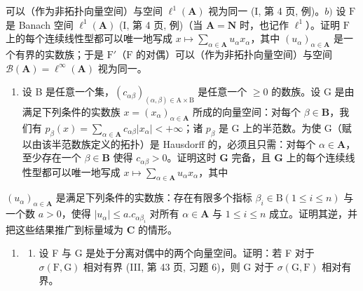 可以（作为非拓扑向量空间）与空间 \(\ell^1 (\mathbf{A})\) 视为同一 (I, 第 4 页, 例)。\(b)\) 设 \(\mathrm{F}\) 是 Banach 空间 \(\ell^1 (\mathbf{A})\) (I, 第 4 页, 例)（当 \(\mathbf{A} = \mathbf{N}\) 时，也记作 \(\ell^1\)）。证明 \(\mathrm{F}\) 上的每个连续线性型都可以唯一地写成 \(x\mapsto \sum_{\alpha \in \mathbf{A}}u_{\alpha}x_{\alpha}\)，其中 \((u_{\alpha})_{\alpha \in \mathbf{A}}\) 是一个有界的实数族；于是 \(\mathrm{F}'\)（\(\mathrm{F}\) 的对偶）可以（作为非拓扑向量空间）与空间 \(\mathcal{B}(\mathbf{A}) = \ell^{\infty}(\mathbf{A})\) 视为同一。

\begin{enumerate}
\def\labelenumi{\alph{enumi})}
\setcounter{enumi}{2}
\tightlist
\item
  设 B 是任意一个集，\((c_{\alpha \beta})_{(\alpha ,\beta)\in \mathrm{A}\times \mathrm{B}}\) 是任意一个 \(\geqslant 0\) 的数族。设 G 是由满足下列条件的实数族 \(x = (x_{\alpha})_{\alpha \in \mathbf{A}}\) 所成的向量空间：对每个 \(\beta \in \mathbf{B}\)，我们有 \(p_{\beta}(x) = \sum_{\alpha \in \mathbf{A}}c_{\alpha \beta}|x_{\alpha}| < + \infty\)；诸 \(p_{\beta}\) 是 G 上的半范数。为使 G（赋以由该半范数族定义的拓扑）是 Hausdorff 的，必须且只需：对每个 \(\alpha \in \mathbf{A}\)，至少存在一个 \(\beta \in \mathbf{B}\) 使得 \(c_{\alpha \beta} > 0\)。证明这时 \(\mathbf{G}\) 完备，且 \(\mathbf{G}\) 上的每个连续线性型都可以唯一地写成 \(x \mapsto \sum_{\alpha \in \mathbf{A}} u_{\alpha} x_{\alpha}\)，其中
\end{enumerate}

\((u_{\alpha})_{\alpha \in \mathbf{A}}\) 是满足下列条件的实数族：存在有限多个指标 \(\beta_{i}\in \mathrm{B}(1\leqslant i\leqslant n)\) 与一个数 \(a > 0\)，使得 \(|u_{\alpha}|\leqslant a.c_{\alpha \beta_i}\) 对所有 \(\alpha \in \mathbf{A}\) 与 \(1\leqslant i\leqslant n\) 成立。证明其逆，并把这些结果推广到标量域为 \(\mathbf{C}\) 的情形。

\begin{enumerate}
\def\labelenumi{\arabic{enumi})}
\setcounter{enumi}{1}
\tightlist
\item
  \begin{enumerate}
  \def\labelenumii{\alph{enumii})}
  \tightlist
  \item
    设 F 与 G 是处于分离对偶中的两个向量空间。证明：若 F 对于 \(\sigma(\mathrm{F}, \mathrm{G})\) 相对有界 (III, 第 43 页, 习题 6)，则 G 对于 \(\sigma(\mathrm{G}, \mathrm{F})\) 相对有界。
  \end{enumerate}
\end{enumerate}

